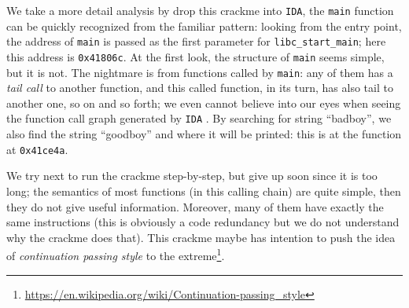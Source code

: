 \documentclass{easychair}
\begin{document}
We take a more detail analysis by drop this crackme into \texttt{IDA}, the \texttt{main} function can be quickly recognized from the familiar pattern: looking from the entry point, the address of \texttt{main} is passed as the first parameter for \texttt{libc\_start\_main}; here this address is \texttt{0x41806c}. At the first look, the structure of \texttt{main} seems simple, but it is not. The nightmare is from functions called by \texttt{main}: any of them has a \emph{tail call} to another function, and this called function, in its turn, has also tail to another one, so on and so forth; we even cannot believe into our eyes when seeing the function call graph generated by \texttt{IDA} \frownie{}. By searching for string ``badboy'', we also find the string ``goodboy'' and where it will be printed: this is at the function at \texttt{0x41ce4a}.

We try next to run the crackme step-by-step, but give up soon since it is too long; the semantics of most functions (in this calling chain) are quite simple, then they do not give useful information. Moreover, many of them have exactly the same instructions (this is obviously a code redundancy but we do not understand why the crackme does that). This crackme maybe has intention to push the idea of \emph{continuation passing style} to the extreme\footnote{\url{https://en.wikipedia.org/wiki/Continuation-passing_style}}.
\end{document}
